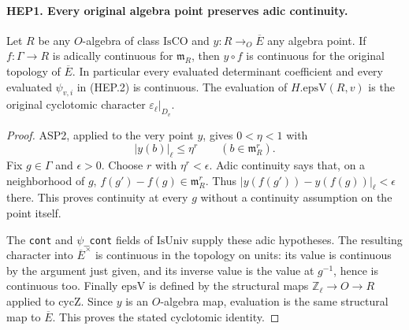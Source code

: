\paragraph{HEP1. Every original algebra point preserves adic continuity.}
\label{claim:HEP1}
Let $R$ be any $O$-algebra of class $\mathrm{IsCO}$ and
$y:R\to_O\overline E$ any algebra point.  If
$f:\Gamma\to R$ is adically continuous for $\mathfrak m_R$,
then $y\circ f$ is continuous for the original topology of
$\overline E$.  In particular every evaluated determinant
coefficient and every evaluated $\psi_{v,i}$ in (HEP.2) is continuous.
The evaluation of $H.\mathrm{epsV}(R,v)$ is the original
cyclotomic character $\varepsilon_\ell|_{D_v}$.
\begin{proof}
ASP2, applied to the very point $y$, gives $0<\eta<1$ with
\[
             |y(b)|_\ell\leq\eta^r
                  \qquad(b\in\mathfrak m_R^r).
 \tag{HEP.3}
\]
Fix $g\in\Gamma$ and $\epsilon>0$.  Choose $r$ with
$\eta^r<\epsilon$.  Adic continuity says that, on a neighborhood
of $g$, $f(g')-f(g)\in\mathfrak m_R^r$.  Thus
$|y(f(g'))-y(f(g))|_\ell<\epsilon$ there.  This proves continuity
at every $g$ without a continuity assumption on the point itself.

The \texttt{cont} and \texttt{\(\psi\)\_cont} fields of
$\mathrm{IsUniv}$ supply these adic hypotheses.  The resulting
character into $\overline E^\times$ is continuous in the topology
on units: its value is continuous by the argument just given, and
its inverse value is the value at $g^{-1}$, hence is continuous too.
Finally $\mathrm{epsV}$ is defined by the structural maps
$\mathbb Z_\ell\to O\to R$ applied to $\mathrm{cycZ}$.
Since $y$ is an $O$-algebra map, evaluation is the same structural
map to $\overline E$.  This proves the stated cyclotomic identity.
\end{proof}


